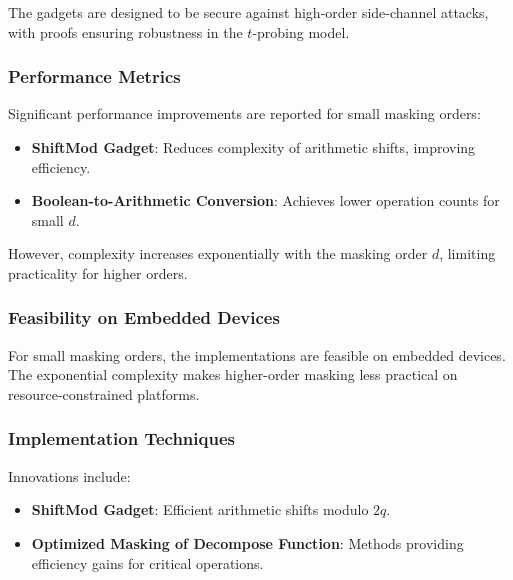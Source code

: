 The gadgets are designed to be secure against high-order side-channel attacks, with proofs ensuring robustness in the $t$-probing model.

\subsubsection{Performance Metrics}

Significant performance improvements are reported for small masking orders:

\begin{itemize}
    \item \textbf{ShiftMod Gadget}: Reduces complexity of arithmetic shifts, improving efficiency.
    \item \textbf{Boolean-to-Arithmetic Conversion}: Achieves lower operation counts for small $d$.
\end{itemize}

However, complexity increases exponentially with the masking order $d$, limiting practicality for higher orders.

\subsubsection{Feasibility on Embedded Devices}

For small masking orders, the implementations are feasible on embedded devices. The exponential complexity makes higher-order masking less practical on resource-constrained platforms.

\subsubsection{Implementation Techniques}

Innovations include:

\begin{itemize}
    \item \textbf{ShiftMod Gadget}: Efficient arithmetic shifts modulo $2q$.
    \item \textbf{Optimized Masking of Decompose Function}: Methods providing efficiency gains for critical operations.
\end{itemize}